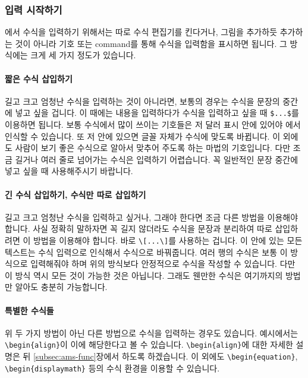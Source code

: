 \subsubsection{입력 시작하기}
\label{subsec:ams-start}
\lt 에서 수식을 입력하기 위해서는 따로 수식 편집기를 킨다거나, 그림을 추가하듯 추가하는 것이 아니라 기호 또는 command를 통해 수식을 입력함을 표시하면 됩니다.
그 방식에는 크게 세 가지 정도가 있습니다.

\paragraph{짧은 수식 삽입하기}
길고 크고 엄청난 수식을 입력하는 것이 아니라면, 보통의 경우는 수식을 문장의 중간에 넣고 싶을 겁니다.
이 때에는 내용을 입력하다가 수식을 입력하고 싶을 때 \verb|$...$|를 이용하면 됩니다.
보통 수식에서 많이 쓰이는 기호들은 저 달러 표시 안에 있어야 \lt 에서 인식할 수 있습니다.
또 저 안에 있으면 글꼴 자체가 수식에 맞도록 바뀝니다.
이 외에도 사람이 보기 좋은 수식으로 알아서 맞추어 주도록 하는 마법의 기호입니다.
다만 조금 길거나 여러 줄로 넘어가는 수식은 입력하기 어렵습니다.
꼭 일반적인 문장 중간에 넣고 싶을 때 사용해주시기 바랍니다.

\paragraph{긴 수식 삽입하기, 수식만 따로 삽입하기}
길고 크고 엄청난 수식을 입력하고 싶거나, 그래야 한다면 조금 다른 방법을 이용해야 합니다.
사실 정확히 말하자면 꼭 길지 않더라도 수식을 문장과 분리하여 따로 삽입하려면 이 방법을 이용해야 합니다.
바로 \verb|\[...\]|를 사용하는 겁니다.
이 안에 있는 모든 텍스트는 수식 입력으로 인식해서 수식으로 바꿔줍니다.
여러 행의 수식은 보통 이 방식으로 입력해줘야 하며 위의 방식보다 안정적으로 수식을 작성할 수 있습니다.
다만 이 방식 역시 모든 것이 가능한 것은 아닙니다.
그래도 웬만한 수식은 여기까지의 방법만 알아도 충분히 가능합니다.

\paragraph{특별한 수식들}
위 두 가지 방법이 아닌 다른 방법으로 수식을 입력하는 경우도 있습니다.
예시에서는 \verb|\begin{align}|이 이에 해당한다고 볼 수 있습니다.
\verb|\begin{align}|에 대한 자세한 설명은 뒤 \ref{subsec:ams-func}장에서 하도록 하겠습니다.
이 외에도 \verb|\begin{equation}|, \verb|\begin{displaymath}| 등의 수식 환경을 이용할 수 있습니다.

